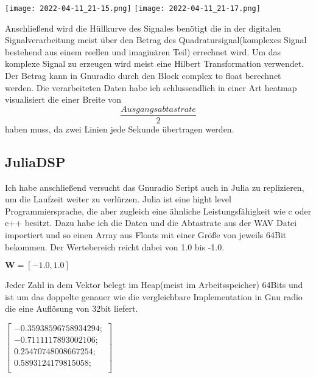 \begin{multicols*}{2}
    \begin{center}
        \centering
        \texttt{[image: 2022-04-11\_21-15.png]}
        \texttt{[image: 2022-04-11\_21-17.png]}
    \end{center} 

    Anschließend wird die Hüllkurve des Signales benötigt die in der digitalen Signalverarbeitung meist über den Betrag des Quadratursignal(komplexes Signal bestehend aus einem reellen und imaginären Teil) errechnet wird. Um das komplexe Signal zu erzeugen wird meist eine Hilbert Transformation verwendet. Der Betrag kann in Gnuradio durch den Block complex to float berechnet werden. 
    Die verarbeiteten Daten habe ich schlussendlich in einer Art heatmap visualisiert die einer Breite von $$\frac{Ausgangsabtastrate}{2} $$ haben muss, da zwei Linien jede Sekunde übertragen werden.
    \subsection*{JuliaDSP}
    Ich habe anschließend versucht das Gnuradio Script auch in Julia zu replizieren, um die Laufzeit weiter zu verlürzen. Julia ist eine hight level Programmiersprache, die aber zugleich eine ähnliche Leistungsfähigkeit wie c oder c++ besitzt.
    Dazu habe ich die Daten und die Abtastrate aus der WAV Datei importiert und so einen Array aus Floats mit einer Größe von jeweils 64Bit bekommen. Der Wertebereich reicht dabei von 1.0 bis -1.0.
   
    \begin{math}
        \mathbf{W} =[-1.0, 1.0]
    \end{math}

    Jeder Zahl in dem Vektor belegt im Heap(meist im Arbeitsspeicher) 64Bits und ist um das doppelte genauer wie die vergleichbare Implementation in Gnu radio die eine Auflösung von 32bit liefert. 

    \begin{math}
        \begin{bmatrix}
            -0.35938596758934294;\\
            -0.7111117893002106;\\
            0.25470748008667254;\\
            0.5893124179815058;\\
        \end{bmatrix}
    \end{math}


\end{multicols*}
